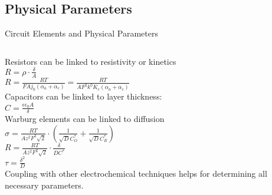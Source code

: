 \documentclass[10pt,compress,handout]{beamer}
\begin{document}
    \subsection{Physical Parameters}
    \begin{frame}{Circuit Elements and Physical Parameters}
        \begin{columns}[t]
                Resistors can be linked to resistivity or kinetics \citep{barsoukov2005}\\
                $R = \rho \cdot \frac{\delta}{A}$ \\
                $R = \frac{RT}{FAj_0(\alpha _a + \alpha _c)} = \frac{RT}{AF^2k^0K_c (\alpha _a + \alpha _c)}$\\[0.25cm]

                Capacitors can be linked to layer thickness: \\
                $C = \frac{\epsilon \epsilon _0 A}{\delta}$\\[0.25cm]

                Warburg elements can be linked to diffusion\\
                $\sigma = \frac{RT}{Az^2F^2\sqrt{2}} \cdot \left( \frac{1}{\sqrt{D}C^*_O} + \frac{1}{\sqrt{D}C^*_R} \right)$\\
                $R = \frac{RT}{Az^2F^2\sqrt{2}} \cdot \frac{\delta}{DC^*}$\\
                $\tau = \frac{\delta ^2}{D}$\\[0.25cm]

                Coupling with other electrochemical techniques helps for determining all 
                necessary parameters.
        \end{columns}
    \end{frame}
    
\end{document}

